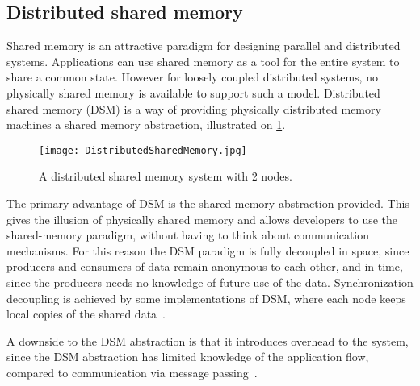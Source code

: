 \subsection{Distributed shared memory}\label{sec:DSM}

Shared memory is an attractive paradigm for designing parallel and distributed systems. Applications can use shared memory as a tool for the entire system to share a common state. However for loosely coupled distributed systems, no physically shared memory is available to support such a model. Distributed shared memory (DSM) is a way of providing physically distributed memory machines a shared memory abstraction, illustrated on \cref{fig:distributedSharedMemory}.

\begin{figure}
	\centering
	\texttt{[image: DistributedSharedMemory.jpg]} 
	\caption[Distributed Computing System with 2 nodes]{
		\label{fig:distributedSharedMemory} 
		\footnotesize{%
			A distributed shared memory system with 2 nodes.
		}
	}
\end{figure}

The primary advantage of DSM is the shared memory abstraction provided. This gives the illusion of physically shared memory and allows developers to use the shared-memory paradigm, without having to think about communication mechanisms. For this reason the DSM paradigm is fully decoupled in space, since producers and consumers of data remain anonymous to each other, and in time, since the producers needs no knowledge of future use of the data. Synchronization decoupling is achieved by some implementations of DSM, where each node keeps local copies of the shared data~\cite{guedes1993distributed}.

A downside to the DSM abstraction is that it introduces overhead to the system, since the DSM abstraction has limited knowledge of the application flow, compared to communication via message passing~\cite{lu1995message}. 

 



